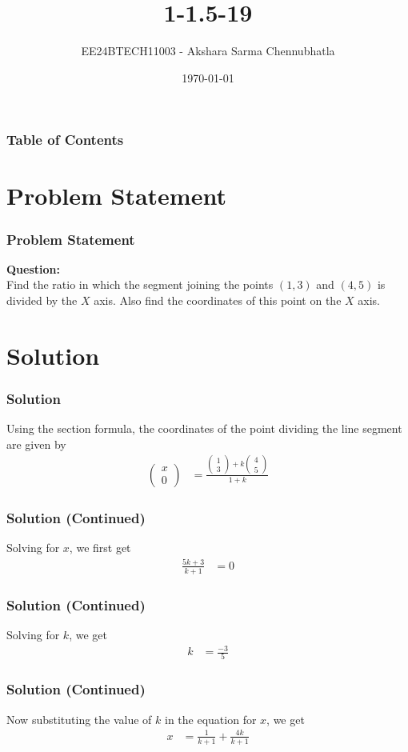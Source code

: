 \documentclass{beamer}
\title{1-1.5-19}
\author{EE24BTECH11003 - Akshara Sarma Chennubhatla}
\date{\today}
\providecommand{\brak}[1]{\ensuremath{\left(#1\right)}}
\theoremstyle{remark}
\newcommand{\myvec}[1]{\ensuremath{\begin{pmatrix}#1\end{pmatrix}}}
\begin{document}
\begin{frame}
\titlepage
\end{frame}

\begin{frame}
\frametitle{Table of Contents}
\tableofcontents
\end{frame}

\section*{Problem Statement}
\begin{frame}
\frametitle{Problem Statement}
\textbf{Question:} \\Find the ratio in which the segment joining the points \brak{1,3} and \brak{4, 5} is divided by the $X$ axis. Also find the coordinates of this point on the $X$ axis.
\end{frame}

\section{Solution}
\begin{frame}
\frametitle{Solution}
Using the section formula, the coordinates of the point dividing the line segment are given by
\begin{align}
\myvec{x\\0}&=\frac{\myvec{1\\3}+k\myvec{4\\5}}{1+k}
\end{align}
\end{frame}

\begin{frame}
\frametitle{Solution (Continued)}
Solving for \( x \), we first get
\begin{align}
\frac{5k+3}{k+1}&=0
\end{align}
\end{frame}

\begin{frame}
\frametitle{Solution (Continued)}
Solving for \( k \), we get
\begin{align}
k&=\frac{-3}{5}
\end{align}
\end{frame}

\begin{frame}
\frametitle{Solution (Continued)}
Now substituting the value of \( k \) in the equation for \( x \), we get
\begin{align}
x&=\frac{1}{k+1}+\frac{4k}{k+1}
\end{align}
\end{frame}
\end{document}
